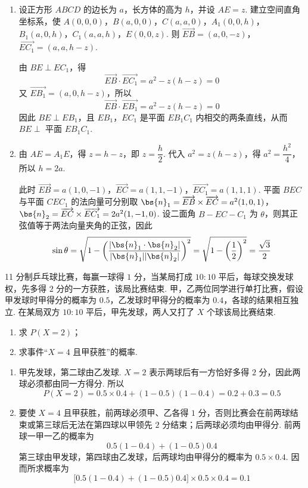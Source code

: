 \begin{solution}
\begin{enumerate}
\item 设正方形 \(ABCD\) 的边长为 \(a\)，长方体的高为 \(h\)，并设 \(AE=z\). 建立空间直角坐标系，使
\(A(0,0,0)\)，\(B(a,0,0)\)，\(C(a,a,0)\)，\(A_1(0,0,h)\)，\(B_1(a,0,h)\)，\(C_1(a,a,h)\)，\(E(0,0,z)\). 则
\(\overrightarrow{EB}=(a,0,-z)\)，\(\overrightarrow{EC_1}=(a,a,h-z)\).

由 \(BE\perp EC_1\)，得
\[
\overrightarrow{EB}\cdot\overrightarrow{EC_1}=a^2-z(h-z)=0
\]
又 \(\overrightarrow{EB_1}=(a,0,h-z)\)，所以
\[
\overrightarrow{EB}\cdot\overrightarrow{EB_1}=a^2-z(h-z)=0
\]
因此 \(BE\perp EB_1\)，且 \(EB_1\)，\(EC_1\) 是平面 \(EB_1C_1\) 内相交的两条直线，从而 \(BE\perp\) 平面 \(EB_1C_1\).

\item 由 \(AE=A_1E\)，得 \(z=h-z\)，即 \(z=\dfrac h2\). 代入 \(a^2=z(h-z)\)，得 \(a^2=\dfrac{h^2}{4}\)，所以 \(h=2a\).

此时
\(\overrightarrow{EB}=a(1,0,-1)\)，\(\overrightarrow{EC}=a(1,1,-1)\)，\(\overrightarrow{EC_1}=a(1,1,1)\).
平面 \(BEC\) 与平面 \(CEC_1\) 的法向量可分别取
\(\bs{n}_1=\overrightarrow{EB}\times\overrightarrow{EC}=a^2(1,0,1)\)，\(\bs{n}_2=\overrightarrow{EC}\times\overrightarrow{EC_1}=2a^2(1,-1,0)\).
设二面角 \(B-EC-C_1\) 为 \(\theta\)，则其正弦值等于两法向量夹角的正弦，因此
\[
\sin\theta=\sqrt{1-\left(\frac{|\bs{n}_1\cdot\bs{n}_2|}{|\bs{n}_1||\bs{n}_2|}\right)^2}=\sqrt{1-\left(\frac12\right)^2}=\frac{\sqrt3}{2}
\]
\end{enumerate}
\end{solution}

\begin{problem}
11 分制乒乓球比赛，每赢一球得 \(1\) 分，当某局打成 \(10:10\) 平后，每球交换发球权，先多得 \(2\) 分的一方获胜，该局比赛结束. 甲，乙两位同学进行单打比赛，假设甲发球时甲得分的概率为 \(0.5\)，乙发球时甲得分的概率为 \(0.4\)，各球的结果相互独立. 在某局双方 \(10:10\) 平后，甲先发球，两人又打了 \(X\) 个球该局比赛结束.

\begin{enumerate}
\item 求 \(P(X=2)\)；
\item 求事件“\(X=4\) 且甲获胜”的概率.
\end{enumerate}
\end{problem}

\begin{solution}
\begin{enumerate}
\item 甲先发球，第二球由乙发球. \(X=2\) 表示两球后有一方恰好多得 \(2\) 分，因此两球必须都由同一方得分. 所以
\[
P(X=2)=0.5\times0.4+(1-0.5)(1-0.4)=0.2+0.3=0.5
\]

\item 要使 \(X=4\) 且甲获胜，前两球必须甲、乙各得 \(1\) 分，否则比赛会在前两球结束或第三球后无法在第四球以甲领先 \(2\) 分结束；后两球必须均由甲得分. 前两球一甲一乙的概率为
\[
0.5(1-0.4)+(1-0.5)0.4
\]
第三球由甲发球，第四球由乙发球，后两球均由甲得分的概率为 \(0.5\times0.4\). 因而所求概率为
\[
\bigl[0.5(1-0.4)+(1-0.5)0.4\bigr]\times0.5\times0.4=0.1
\]
\end{enumerate}
\end{solution}

